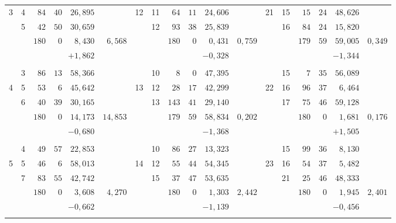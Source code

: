 \begin{center}
\begin{tabular}{|r|r|r@{\;}r@{\;}r|r||r|r|r@{\;}r@{\;}r|r||r|r|r@{\;}r@{\;}r|r|}
3 & 4 & $84$ & $40$ & $26{,}895$ &  & 12 & 11 & $64$ & $11$ & $24{,}606$ &  & 21 & 15 & $15$ & $24$ & $48{,}626$ & \\
 & 5 & $42$ & $50$ & $30{,}659$ &  &  & 12 & $93$ & $38$ & $25{,}839$ &  &  & 16 & $84$ & $24$ & $15{,}820$ & \\
\cline{3-5}\cline{9-11}\cline{15-17}
 &  & $180$ & $0$ & $8{,}430$ & $6{,}568$ &  &  & $180$ & $0$ & $0{,}431$ & $0{,}759$ &  &  & $179$ & $59$ & $59{,}005$ & $0{,}349$\\
 &  & \multicolumn{3}{r|}{$+1{,}862$} &  &  &  & \multicolumn{3}{r|}{$-0{,}328$} &  &  &  & \multicolumn{3}{r|}{$-1{,}344$} & \\
 &  &  &  &  &  &  &  &  &  &  &  &  &  &  &  &  & \\
 & 3 & $86$ & $13$ & $58{,}366$ &  &  & 10 & $8$ & $0$ & $47{,}395$ &  &  & 15 & $7$ & $35$ & $56{,}089$ & \\
4 & 5 & $53$ & $6$ & $45{,}642$ &  & 13 & 12 & $28$ & $17$ & $42{,}299$ &  & 22 & 16 & $96$ & $37$ & $6{,}464$ & \\
 & 6 & $40$ & $39$ & $30{,}165$ &  &  & 13 & $143$ & $41$ & $29{,}140$ &  &  & 17 & $75$ & $46$ & $59{,}128$ & \\
\cline{3-5}\cline{9-11}\cline{15-17}
 &  & $180$ & $0$ & $14{,}173$ & $14{,}853$ &  &  & $179$ & $59$ & $58{,}834$ & $0{,}202$ &  &  & $180$ & $0$ & $1{,}681$ & $0{,}176$\\
 &  & \multicolumn{3}{r|}{$-0{,}680$} &  &  &  & \multicolumn{3}{r|}{$-1{,}368$} &  &  &  & \multicolumn{3}{r|}{$+1{,}505$} & \\
 &  &  &  &  &  &  &  &  &  &  &  &  &  &  &  &  & \\
 & 4 & $49$ & $57$ & $22{,}853$ &  &  & 10 & $86$ & $27$ & $13{,}323$ &  &  & 15 & $99$ & $36$ & $8{,}130$ & \\
5 & 5 & $46$ & $6$ & $58{,}013$ &  & 14 & 12 & $55$ & $44$ & $54{,}345$ &  & 23 & 16 & $54$ & $37$ & $5{,}482$ & \\
 & 7 & $83$ & $55$ & $42{,}742$ &  &  & 15 & $37$ & $47$ & $53{,}635$ &  &  & 21 & $25$ & $46$ & $48{,}333$ & \\
\cline{3-5}\cline{9-11}\cline{15-17}
 &  & $180$ & $0$ & $3{,}608$ & $4{,}270$ &  &  & $180$ & $0$ & $1{,}303$ & $2{,}442$ &  &  & $180$ & $0$ & $1{,}945$ & $2{,}401$\\
 &  & \multicolumn{3}{r|}{$-0{,}662$} &  &  &  & \multicolumn{3}{r|}{$-1{,}139$} &  &  &  & \multicolumn{3}{r|}{$-0{,}456$} & \\
 &  &  &  &  &  &  &  &  &  &  &  &  &  &  &  &  & \\

\end{tabular}
\end{center}
